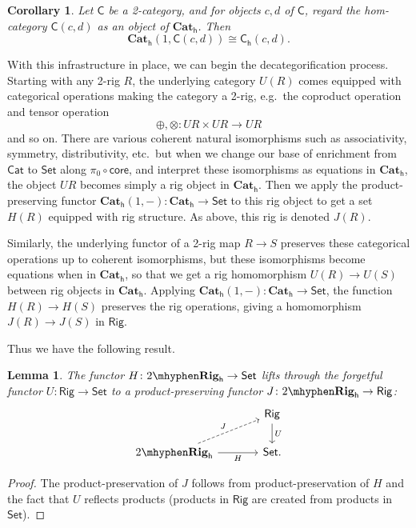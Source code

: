 \documentclass[12pt,reqno]{amsart}
\theoremstyle{plain}
\newtheorem{lem}[thm]{Lemma}
\newtheorem{cor}[thm]{Corollary}
\theoremstyle{definition}
\theoremstyle{remark}
\newcommand{\maps}{\colon}
\newcommand{\core}{\mathsf{core}}
\newcommand{\category}[1]{\mathsf{#1}}
\newcommand{\C}{\category C}
\newcommand{\namedcat}[1]{\mathsf{#1}}
\newcommand{\Cat}{\namedcat{Cat}}
\newcommand{\Rig}{\namedcat{Rig}}
\newcommand{\Set}{\namedcat{Set}}
\newcommand{\TRig}{2\mhyphen\namedbicat{Rig}}
\newcommand{\namedbicat}[1]{\mathbf{#1}}
\newcommand{\CCat}{\namedbicat{Cat}}
\newcommand{\ho}{_\mathsf{h}}
\numberwithin{thm}{section}
\begin{document}
\begin{cor}
\label{cor:hom-change}
    Let $\C$ be a 2-category, and for objects $c, d$ of $\C$, regard the hom-category $\C(c, d)$ as an object of $\CCat\ho$. Then 
    \[
        \CCat\ho(1, \C(c, d)) \cong \C\ho(c, d).
    \]
\end{cor}

With this infrastructure in place, we can begin the decategorification process. Starting with any 2-rig $R$, the underlying category $U(R)$ comes equipped with categorical operations making the category a 2-rig, e.g.\ the coproduct operation and tensor operation 
\[
    \oplus, \otimes \maps UR \times UR \to UR
\]
and so on. There are various coherent natural isomorphisms such as associativity, symmetry, distributivity, etc.\ but when we change our base of enrichment from $\Cat$ to $\Set$ along $\pi_0 \circ \core$, and interpret these isomorphisms as equations in $\CCat\ho$, the object $UR$ becomes simply a rig object in $\CCat\ho$. Then we apply the product-preserving functor $\CCat\ho(1, -) \maps \CCat\ho \to \Set$ to this rig object to get a set $H(R)$ equipped with rig structure. As above, this rig is denoted $J(R)$. 

Similarly, the underlying functor of a 2-rig map $R \to S$ preserves these categorical operations up to coherent isomorphisms, but these isomorphisms become equations when in $\CCat\ho$, so that we get a rig homomorphism $U(R) \to U(S)$ between rig objects in $\CCat\ho$. Applying $\CCat\ho(1, -) \maps \CCat\ho \to \Set$, the function $H(R) \to H(S)$ preserves the rig operations, giving a homomorphism $J(R) \to J(S)$ in $\Rig$. 

Thus we have the following result. 

\begin{lem}
    The functor $H \maps \TRig\ho \to \Set$ lifts through the forgetful functor $U \maps \Rig \to \Set$ to a product-preserving functor $J \maps \TRig\ho \to \Rig$: 
    \[
    \begin{tikzcd}[column sep = large]
        &
        \Rig
        \arrow[d, "U"]
        \\
        \TRig\ho
        \arrow[r, swap, "H"]
        \arrow[ur, dashed, "J"]
        &
        \Set.
    \end{tikzcd}
    \]
\end{lem}

\begin{proof} 
    The product-preservation of $J$ follows from product-preservation of $H$ and the fact that $U$ reflects products (products in $\Rig$ are created from products in $\Set$). 
\end{proof}
\end{document}
